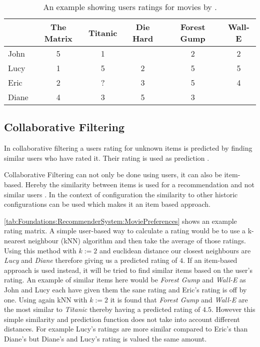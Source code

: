 \begin{table}
    \centering    
    \begin{tabular}{ l | c | c | c | c | c }
        & The Matrix & Titanic & Die Hard & Forest Gump & Wall-E \\ \hline
         John  & 5 & 1 &   & 2 & 2 \\
         Lucy  & 1 & 5 & 2 & 5 & 5 \\
         Eric  & 2 & ? & 3 & 5 & 4 \\
         Diane & 4 & 3 & 5 & 3 &   \\
    \end{tabular}
    \caption{An example showing users ratings for movies by \citeauthor{ningComprehensiveSurveyNeighborhoodBased2015} \cite{ningComprehensiveSurveyNeighborhoodBased2015}.}
    
    \label{tab:Foundations:RecommenderSystem:MoviePreferences}
\end{table}

\subsection{Collaborative Filtering}
In collaborative filtering a users rating for unknown items is predicted by finding similar users who have rated it. Their rating is used as prediction
\cite[~ pp. 7, 8]{felfernigDecisionTasksBasic2018}.

Collaborative Filtering can not only be done using users, it can also be item-based. Hereby the similarity between items is used for a recommendation and not similar users \cite{ricciRecommenderSystemsHandbook2015}. In the context of configuration the similarity to other historic configurations can be used which makes it an item based approach. 

\autoref{tab:Foundations:RecommenderSystem:MoviePreferences} shows an example rating matrix. A simple user-based way to calculate a rating would be to use a k-nearest neighbour (kNN) algorithm and then take the average of those ratings. Using this method with $k := 2$ and euclidean distance our closest neighbours are \textit{Lucy} and \textit{Diane} therefore giving us a predicted rating of $4$. If an item-based approach is used instead, it will be tried to find similar items based on the user's rating. An example of similar items here would be \textit{Forest Gump} and \textit{Wall-E} as John and Lucy each have given them the sane rating and Eric's rating is off by one. Using again kNN with $k := 2$ it is found that \textit{Forest Gump} and \textit{Wall-E} are the most similar to \textit{Titanic} thereby having a predicted rating of $4.5$.
However this simple similarity and prediction function does not take into account different distances. For example Lucy's ratings are more similar compared to Eric's than Diane's but Diane's and Lucy's rating is valued the same amount.

